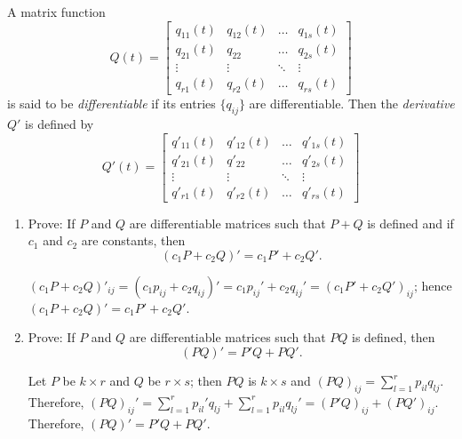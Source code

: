 \documentclass{ximera}
\begin{document}
\begin{problem}\label{exer:10.2.7}
 A matrix function
$$
Q(t)=\begin{bmatrix}
           q_{11}(t) & q_{12}(t) &\dots& q_{1s}(t)\\
           q_{21}(t) & q_{22} &\dots& q_{2s}(t)\\
        \vdots & \vdots& \ddots & \vdots\\
        q_{r1}(t) &q_{r2}(t) &\dots& q_{rs}(t)
         \end{bmatrix}
$$
is  said to be  {\color{blue}\it differentiable\/}
if its entries $\{q_{ij}\}$ are  differentiable.  Then the {\color{blue}\it
derivative\/}  $Q'$ is defined by
 $$
Q'(t)=\begin{bmatrix}
           q'_{11}(t) & q'_{12}(t) &\dots& q'_{1s}(t)\\
           q'_{21}(t) & q'_{22} &\dots& q'_{2s}(t)\\
        \vdots & \vdots& \ddots & \vdots\\
        q'_{r1}(t) &q'_{r2}(t) &\dots& q'_{rs}(t)
         \end{bmatrix}
$$
\begin{enumerate}
\item %
Prove: If $P$ and $Q$ are differentiable matrices such that $P+Q$ is
defined and if  $c_1$ and $c_2$ are constants, then
$$
(c_1P+c_2Q)'=c_1P'+c_2Q'.
$$

\begin{solution}
    $(c_1P+c_2Q)'_{ij}=
(c_1p_{ij}+c_2q_{ij})'=c_1p_{ij}'+c_2q_{ij}'=(c_1P'+c_2Q')_{ij}$;
hence
$(c_1P+c_2Q)'=c_1P'+c_2Q'$.
\end{solution}

\item %
Prove: If $P$ and $Q$ are differentiable matrices such that $PQ$ is
defined, then
$$
(PQ)'=P'Q+PQ'.
$$

\begin{solution}
    Let $P$ be $k\times r$ and $Q$ be $r\times s$; then
$PQ$ is $k\times s$ and $(PQ)_{ij}=\sum_{l=1}^rp_{il}q_{l j}$.
Therefore,
$(PQ)_{ij}'=\sum_{l=1}^rp_{il}'q_{l j}
+\sum_{l=1}^rp_{il}q_{l j}'=(P'Q)_{ij}+(PQ')_{ij}$. Therefore,
$(PQ)'=P'Q+PQ'$.
\end{solution}
\end{enumerate}
\end{problem}
\end{document}
